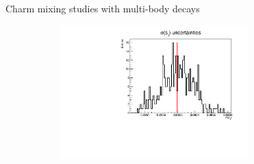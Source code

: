 \documentclass[xcolor={dvipsnames}]{beamer}
\begin{document}
\begin{frame}{Charm mixing studies with multi-body decays}
\begin{figure}[htb]
\begin{subfigure}{0.5\textwidth}
      \includegraphics[width=0.8\textwidth]{Plots/s_1_err_hist.pdf}
    \end{subfigure}
    \vspace{-0.5cm}
  \end{figure}
\end{frame}
\end{document}

